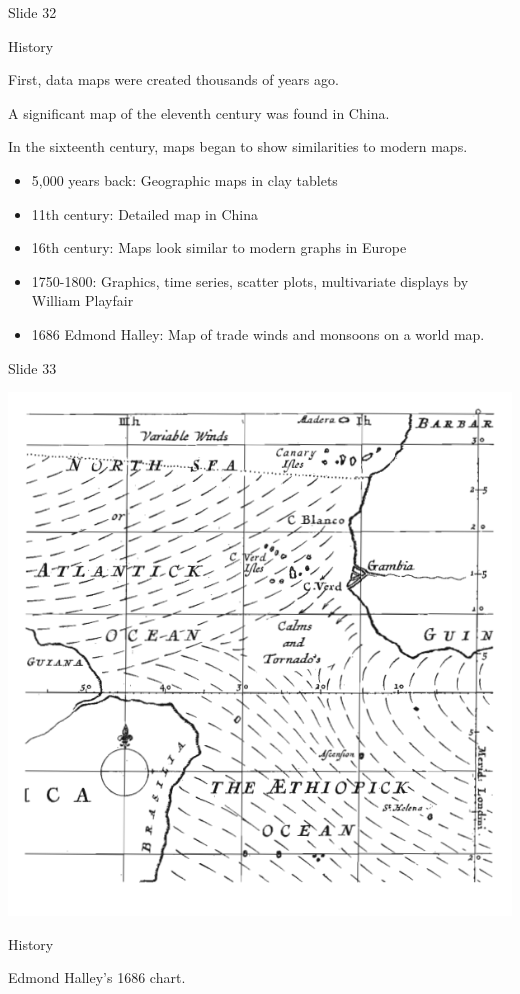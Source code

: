 \documentclass[
  ignorenonframetext,
]{beamer}
\begin{document}
\begin{frame}{Slide 32}
\protect\hypertarget{slide-32}{}
\footnotesize

History

First, data maps were created thousands of years ago.

A significant map of the eleventh century was found in China.

In the sixteenth century, maps began to show similarities to modern
maps.

\begin{itemize}
  \item 5,000 years back: Geographic maps in clay tablets
  \item 11th century: Detailed map in China
  \item 16th century: Maps look similar to modern graphs in Europe
  \item 1750-1800: Graphics, time series, scatter plots, multivariate displays by William Playfair
  \item 1686 Edmond Halley: Map of trade winds and monsoons on a world map.
\end{itemize}
\end{frame}

\begin{frame}{Slide 33}
\protect\hypertarget{slide-33}{}
\begin{minipage}{0.45\textwidth}
\centering
\includegraphics[width=\textwidth]{excellence_figs/fig_28.png}
\end{minipage}
\hfill
\begin{minipage}{0.5\textwidth}
\footnotesize
History

Edmond Halley's 1686 chart.
\end{minipage}
\end{frame}
\end{document}
